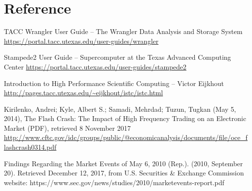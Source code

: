 \documentclass[12pt]{article} %
\begin{document}

\newpage

\section{Reference}

\begin{flushleft}

TACC Wrangler User Guide  -- The Wrangler Data Analysis and Storage System \url{https://portal.tacc.utexas.edu/user-guides/wrangler}

Stampede2 User Guide -- Supercomputer at the Texas Advanced Computing Center \url{https://portal.tacc.utexas.edu/user-guides/stampede2}

Introduction to High Performance Scientific Computing -- Victor Eijkhout \\ \url{http://pages.tacc.utexas.edu/~eijkhout/istc/istc.html}

Kirilenko, Andrei; Kyle, Albert S.; Samadi, Mehrdad; Tuzun, Tugkan (May 5, 2014), The Flash Crash: The Impact of High Frequency Trading on an Electronic Market (PDF), retrieved 8 November 2017 \\ \url{http://www.cftc.gov/idc/groups/public/@economicanalysis/documents/file/oce_flashcrash0314.pdf}

Findings Regarding the Market Events of May 6, 2010 (Rep.). (2010, September 20). Retrieved December 12, 2017, from U.S. Securities \& Exchange Commission website: https://www.sec.gov/news/studies/2010/marketevents-report.pdf

\end{flushleft}
\end{document}
